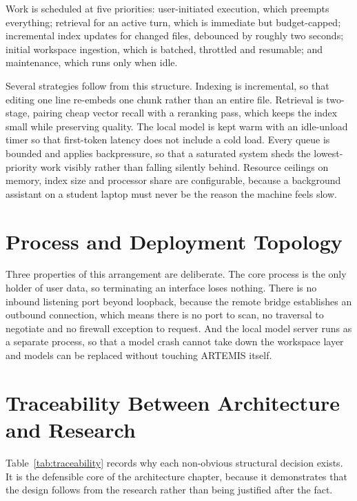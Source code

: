 \documentclass[11pt]{article}
\begin{document}
Work is scheduled at five priorities: user-initiated execution, which preempts everything;
retrieval for an active turn, which is immediate but budget-capped; incremental index
updates for changed files, debounced by roughly two seconds; initial workspace ingestion,
which is batched, throttled and resumable; and maintenance, which runs only when idle.

Several strategies follow from this structure. Indexing is incremental, so that editing
one line re-embeds one chunk rather than an entire file. Retrieval is two-stage, pairing
cheap vector recall with a reranking pass, which keeps the index small while preserving
quality. The local model is kept warm with an idle-unload timer so that first-token
latency does not include a cold load. Every queue is bounded and applies backpressure, so
that a saturated system sheds the lowest-priority work visibly rather than falling
silently behind. Resource ceilings on memory, index size and processor share are
configurable, because a background assistant on a student laptop must never be the reason
the machine feels slow.

\section{Process and Deployment Topology}


Three properties of this arrangement are deliberate. The core process is the only holder
of user data, so terminating an interface loses nothing. There is no inbound listening
port beyond loopback, because the remote bridge establishes an outbound connection, which
means there is no port to scan, no traversal to negotiate and no firewall exception to
request. And the local model server runs as a separate process, so that a model crash
cannot take down the workspace layer and models can be replaced without touching ARTEMIS
itself.

\section{Traceability Between Architecture and Research}

Table~\ref{tab:traceability} records why each non-obvious structural decision exists. It
is the defensible core of the architecture chapter, because it demonstrates that the
design follows from the research rather than being justified after the fact.
\end{document}
